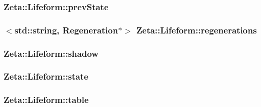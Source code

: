 \hypertarget{classZeta_1_1Lifeform_a1246baf7d5323079611928f07a72a997}{
\subsubsection[{prev\+State}]{ Zeta\+::\+Lifeform\+::prev\+State\hspace{0.3cm}{\ttfamily [protected]}}}\label{classZeta_1_1Lifeform_a1246baf7d5323079611928f07a72a997}
\hypertarget{classZeta_1_1Lifeform_ae52c17b261ae604b6d397250d1880e60}{
\subsubsection[{regenerations}]{$<$std\+::string, {\bf Regeneration}$\ast$$>$ Zeta\+::\+Lifeform\+::regenerations\hspace{0.3cm}{\ttfamily [protected]}}}\label{classZeta_1_1Lifeform_ae52c17b261ae604b6d397250d1880e60}
\hypertarget{classZeta_1_1Lifeform_a29237d06af5397c6c01d75eba15a19ae}{
\subsubsection[{shadow}]{ Zeta\+::\+Lifeform\+::shadow\hspace{0.3cm}{\ttfamily [protected]}}}\label{classZeta_1_1Lifeform_a29237d06af5397c6c01d75eba15a19ae}
\hypertarget{classZeta_1_1Lifeform_a3b82b64b65c5cd5368207288beac1abe}{
\subsubsection[{state}]{ Zeta\+::\+Lifeform\+::state\hspace{0.3cm}{\ttfamily [protected]}}}\label{classZeta_1_1Lifeform_a3b82b64b65c5cd5368207288beac1abe}
\hypertarget{classZeta_1_1Lifeform_a21a6e67148dc921adb0ae02af0e8e729}{
\subsubsection[{table}]{ Zeta\+::\+Lifeform\+::table\hspace{0.3cm}{\ttfamily [protected]}}}\label{classZeta_1_1Lifeform_a21a6e67148dc921adb0ae02af0e8e729}
